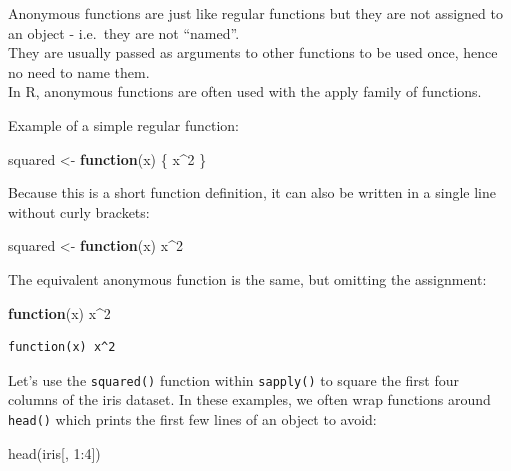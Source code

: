 \documentclass[
]{book}
\newenvironment{Shaded}{\begin{snugshade}}{\end{snugshade}}
\newcommand{\ControlFlowTok}[1]{\textcolor[rgb]{0.13,0.29,0.53}{\textbf{#1}}}
\newcommand{\DecValTok}[1]{\textcolor[rgb]{0.00,0.00,0.81}{#1}}
\newcommand{\FunctionTok}[1]{\textcolor[rgb]{0.00,0.00,0.00}{#1}}
\newcommand{\NormalTok}[1]{#1}
\newcommand{\OtherTok}[1]{\textcolor[rgb]{0.56,0.35,0.01}{#1}}
\newcommand{\SpecialCharTok}[1]{\textcolor[rgb]{0.00,0.00,0.00}{#1}}
\begin{document}
Anonymous functions are just like regular functions but they are not assigned to an object - i.e.~they are not ``named''.\\
They are usually passed as arguments to other functions to be used once, hence no need to name them.\\
In R, anonymous functions are often used with the apply family of functions.

Example of a simple regular function:

\begin{Shaded}
\begin{Highlighting}[]
\NormalTok{squared }\OtherTok{\textless{}{-}} \ControlFlowTok{function}\NormalTok{(x) \{}
\NormalTok{  x}\SpecialCharTok{\^{}}\DecValTok{2}
\NormalTok{\}}
\end{Highlighting}
\end{Shaded}

Because this is a short function definition, it can also be written in a single line without curly brackets:

\begin{Shaded}
\begin{Highlighting}[]
\NormalTok{squared }\OtherTok{\textless{}{-}} \ControlFlowTok{function}\NormalTok{(x) x}\SpecialCharTok{\^{}}\DecValTok{2}
\end{Highlighting}
\end{Shaded}

The equivalent anonymous function is the same, but omitting the assignment:

\begin{Shaded}
\begin{Highlighting}[]
\ControlFlowTok{function}\NormalTok{(x) x}\SpecialCharTok{\^{}}\DecValTok{2}
\end{Highlighting}
\end{Shaded}

\begin{verbatim}
function(x) x^2
\end{verbatim}

Let's use the \texttt{squared()} function within \texttt{sapply()} to square the first four columns of the iris dataset. In these examples, we often wrap functions around \texttt{head()} which prints the first few lines of an object to avoid:

\begin{Shaded}
\begin{Highlighting}[]
\FunctionTok{head}\NormalTok{(iris[, }\DecValTok{1}\SpecialCharTok{:}\DecValTok{4}\NormalTok{])}
\end{Highlighting}
\end{Shaded}
\end{document}
